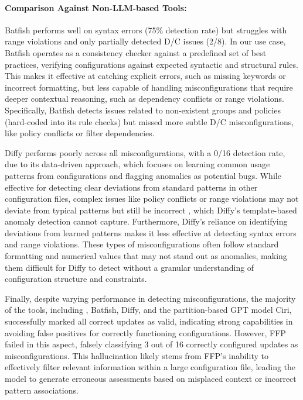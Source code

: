 \paragraph{Comparison Against Non-LLM-based Tools:} Batfish performs well on
syntax errors (75\% detection rate) but struggles with range violations and
only partially detected D/C issues (2/8). In our use case, Batfish operates as a consistency checker against a predefined set of best practices, verifying configurations against expected syntactic and structural rules. 
This makes it effective at catching explicit errors, such as missing keywords or incorrect formatting, but less capable of handling misconfigurations that require deeper contextual reasoning, such as dependency conflicts or range violations. Specifically, Batfish 
detects issues related to non-existent groups and policies (hard-coded into its
rule checks) but missed more subtle D/C misconfigurations, like policy
conflicts or filter dependencies.

Diffy performs poorly across all misconfigurations, with a 0/16 detection rate, due to its data-driven approach, which focuses on learning common usage patterns from configurations and flagging anomalies as potential bugs. While effective for detecting clear deviations from standard patterns in other configuration files,
complex issues like policy conflicts or range violations may not deviate from typical patterns but still be incorrect , which Diffy’s template-based anomaly detection cannot capture. Furthermore, Diffy's reliance on identifying deviations from learned patterns makes it less effective at detecting syntax errors and range violations.  These types of misconfigurations often follow standard formatting and numerical values that may not stand out as anomalies, making them difficult for Diffy to detect without a granular understanding of configuration structure and constraints.

Finally, despite varying performance in detecting misconfigurations, the majority of the tools, including \sysname{}, Batfish, Diffy, and the partition-based GPT model Ciri, successfully marked all correct updates as valid, indicating strong capabilities in avoiding false positives for correctly functioning configurations. 
However, FFP failed in this aspect, falsely classifying 3 out of 16 correctly configured updates as misconfigurations. This hallucination likely stems from FFP’s inability to effectively filter relevant information within a large configuration file, leading the model to generate erroneous assessments based on misplaced context or incorrect pattern associations. 

